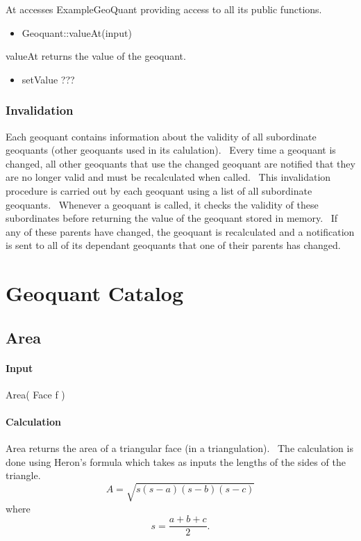 \qquad \qquad At accesses ExampleGeoQuant providing access to all its public
functions.

\begin{itemize}
\item Geoquant::valueAt(input)
\end{itemize}

\qquad \qquad valueAt returns the value of the geoquant.

\begin{itemize}
\item setValue ???
\end{itemize}

\subsubsection{Invalidation}

Each geoquant contains information about the validity of all subordinate
geoquants (other geoquants used in its calulation). \ Every time a geoquant
is changed, all other geoquants that use the changed geoquant are notified
that they are no longer valid and must be recalculated when called. \ This
invalidation procedure is carried out by each geoquant using a list of all
subordinate geoquants. \ Whenever a geoquant is called, it checks the
validity of these subordinates before returning the value of the geoquant
stored in memory. \ If any of these parents have changed, the geoquant is
recalculated and a notification is sent to all of its dependant geoquants
that one of their parents has changed.

\section{Geoquant Catalog}

\subsection{Area}

\paragraph{Input}

Area( Face f )

\paragraph{Calculation}

Area returns the area of a triangular face (in a triangulation). \ The
calculation is done using Heron's formula which takes as inputs the lengths
of the sides of the triangle.%
\begin{equation*}
A=\sqrt{s\left( s-a\right) \left( s-b\right) \left( s-c\right) }
\end{equation*}%
where%
\begin{equation*}
s=\frac{a+b+c}{2}.
\end{equation*}

